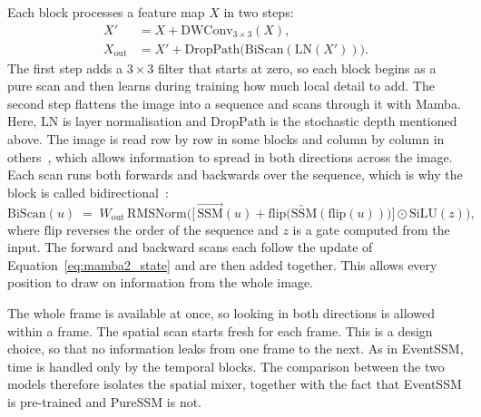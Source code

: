 \documentclass[11pt, a4paper]{report}
\begin{document}
Each block processes a feature map $X$ in two steps:
\begin{align}
  X' &= X + \mathrm{DWConv}_{3\times3}(X), \label{eq:bimamba_local}\\
  X_{\mathrm{out}} &= X' + \mathrm{DropPath}\big(\mathrm{BiScan}(\mathrm{LN}(X'))\big). \label{eq:bimamba_block}
\end{align}
The first step adds a $3\times3$ filter that starts at zero, so each block begins as a pure scan and then
learns during training how much local detail to add. The second step flattens the image into a sequence and
scans through it with Mamba. Here, $\mathrm{LN}$ is layer normalisation and $\mathrm{DropPath}$ is the stochastic
depth mentioned above. The image is read row by row in some blocks and column by column in
others~\cite{li2024mamband}, which allows information to spread in both directions across the image. Each
scan runs both forwards and backwards over the sequence, which is why the block is called
bidirectional~\cite{zhu2024vision}:
\begin{equation}
  \mathrm{BiScan}(u) \;=\; W_{\mathrm{out}}\,\mathrm{RMSNorm}\Big(\big[\,\overrightarrow{\mathrm{SSM}}(u)
  + \mathrm{flip}\big(\overleftarrow{\mathrm{SSM}}(\mathrm{flip}(u))\big)\big]\odot\mathrm{SiLU}(z)\Big),
  \label{eq:biscan}
\end{equation}
where $\mathrm{flip}$ reverses the order of the sequence and $z$ is a gate computed from the input. The
forward and backward scans each follow the update of Equation~\eqref{eq:mamba2_state} and are then added
together. This allows every position to draw on information from the whole image.

The whole frame is available at once, so looking in both directions is allowed within a frame. The spatial
scan starts fresh for each frame. This is a design choice, so that no information leaks from one frame to
the next. As in EventSSM, time is handled only by the temporal blocks. The comparison between the two
models therefore isolates the spatial mixer, together with the fact that EventSSM is pre-trained and
PureSSM is not.
\newpage
\end{document}
